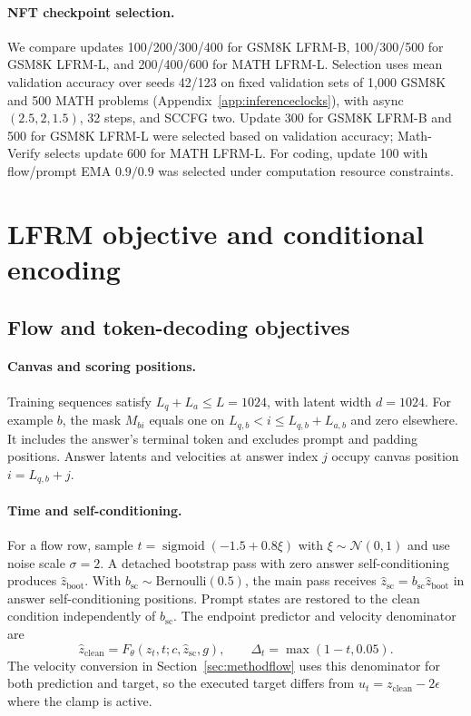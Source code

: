 \documentclass{article}
\begin{document}
\paragraph{NFT checkpoint selection.}
We compare updates 100/200/300/400 for GSM8K LFRM-B, 100/300/500 for GSM8K LFRM-L, and 200/400/600 for MATH LFRM-L. Selection uses mean validation accuracy over seeds 42/123 on fixed validation sets of 1,000 GSM8K and 500 MATH problems (Appendix~\ref{app:inferenceclocks}), with async $(2.5,2,1.5)$, 32 steps, and SCCFG two. Update 300 for GSM8K LFRM-B and 500 for GSM8K LFRM-L were selected based on validation accuracy; Math-Verify selects update 600 for MATH LFRM-L. For coding, update 100 with flow/prompt EMA $0.9/0.9$ was selected under computation resource constraints.

\clearpage
\section{LFRM objective and conditional encoding}
\label{app:methodobjective}

\subsection{Flow and token-decoding objectives}

\paragraph{Canvas and scoring positions.}
Training sequences satisfy $L_q+L_a\le L=1024$, with latent width $d=1024$. For example $b$, the mask $M_{bi}$ equals one on $L_{q,b}<i\le L_{q,b}+L_{a,b}$ and zero elsewhere. It includes the answer's terminal token and excludes prompt and padding positions. Answer latents and velocities at answer index $j$ occupy canvas position $i=L_{q,b}+j$.

\paragraph{Time and self-conditioning.}
For a flow row, sample $t=\operatorname{sigmoid}(-1.5+0.8\xi)$ with $\xi\sim\mathcal N(0,1)$ and use noise scale $\sigma=2$. A detached bootstrap pass with zero answer self-conditioning produces $\widehat z_{\mathrm{boot}}$. With $b_{\mathrm{sc}}\sim\mathrm{Bernoulli}(0.5)$, the main pass receives $\widehat z_{\mathrm{sc}}=b_{\mathrm{sc}}\widehat z_{\mathrm{boot}}$ in answer self-conditioning positions. Prompt states are restored to the clean condition independently of $b_{\mathrm{sc}}$. The endpoint predictor and velocity denominator are
\begin{equation}
 \widehat z_{\mathrm{clean}}=F_\theta(z_t,t;c,\widehat z_{\mathrm{sc}},g),
 \qquad \Delta_t=\max(1-t,0.05).
 \label{eq:methodendpoint}
\end{equation}
The velocity conversion in Section~\ref{sec:methodflow} uses this denominator for both prediction and target, so the executed target differs from $u_t=z_{\mathrm{clean}}-2\epsilon$ where the clamp is active.
\end{document}
